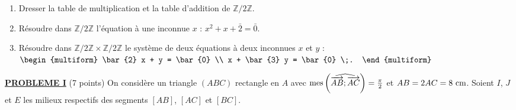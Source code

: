 \begin{description}
\begin{enumerate}
\begin{enumerate}
                                    \item Dresser la table de multiplication et la table d'addition de $\mathbb{Z}/2\mathbb{Z}$.
                                    \item R\'esoudre dans $\mathbb{Z}/2\mathbb{Z}$ l'\'equation \`a une inconnue $x$ : 
                                          $x^2 + x + \bar{2} = \bar{0}$.
                                    \item R\'esoudre dans $\mathbb{Z}/2\mathbb{Z} \times \mathbb{Z}/2\mathbb{Z}$
                                          le syst\`eme de deux \'equations \`a deux inconnues $x$ et $y$ : 
                                          $
                                                \begin{multiform}
                                                      \bar{2} x + y = \bar{0} \\
                                                      x + \bar{3} y = \bar{0} \;.
                                                \end{multiform}
                                          $
                              \end{enumerate}
                  \end{enumerate}
      \end{description}
\noindent \underline{\textsc{\textbf{PROBLEME I}}} (7 points) \newline
      On consid\`ere un triangle $(ABC)$ rectangle en $A$ avec $\mathrm{mes}\left( \widehat{ \overrightarrow{AB} ; \overrightarrow{AC} } \right) = \frac{\pi}{2}$ et $AB = 2 AC = 8 ~\mathrm{cm}$.
      Soient $I$, $J$ et $E$ les milieux respectifs des segments $[AB]$, $[AC]$ et $[BC]$.
